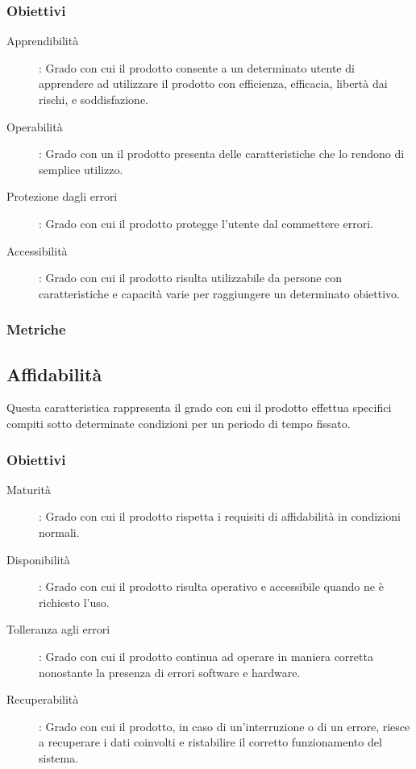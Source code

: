 \documentclass[../piano-di-qualifica.tex]{subfiles}
\begin{document}
\subsubsection{Obiettivi}%
\label{subs:obiettivi}
      \begin{description}
        \item [Apprendibilità]: Grado con cui il prodotto consente a un determinato utente di apprendere ad utilizzare il prodotto con efficienza, efficacia, libertà dai rischi, e soddisfazione.
        \item [Operabilità]: Grado con un il prodotto presenta delle caratteristiche che lo rendono di semplice utilizzo.
        \item [Protezione dagli errori]: Grado con cui il prodotto protegge l'utente dal commettere errori.
        \item [Accessibilità]: Grado con cui il prodotto risulta utilizzabile da persone con caratteristiche e capacità varie per raggiungere un determinato obiettivo.
      \end{description}

\subsubsection{Metriche}%
\label{subs:metriche}



\subsection{Affidabilità}%
\label{sub:affidabilita}
 Questa caratteristica rappresenta il grado con cui il prodotto effettua specifici compiti sotto determinate condizioni per un periodo di tempo fissato.
\subsubsection{Obiettivi}%
\label{subs:obiettivi}
      \begin{description}
        \item [Maturità]: Grado con cui il prodotto rispetta i requisiti di affidabilità in condizioni normali.
        \item [Disponibilità]: Grado con cui il prodotto risulta operativo e accessibile quando ne è richiesto l'uso.
        \item [Tolleranza agli errori]: Grado con cui il prodotto continua ad operare in maniera corretta nonostante la presenza di errori software e hardware.
        \item [Recuperabilità]: Grado con cui il prodotto, in caso di un'interruzione o di un errore, riesce a recuperare i dati coinvolti e ristabilire il corretto funzionamento del sistema.
      \end{description}
\end{document}
